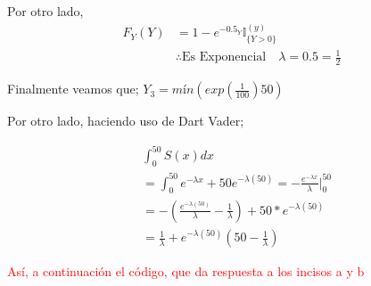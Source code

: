 \documentclass[
]{article}
\begin{document}
Por otro lado, \begin{align*}
F_{Y}(Y) &= 1 - e^{-0.5_{Y}} \mathbb{I}_{\{Y > 0\}}^{(y)}\\
&\therefore \text{Es Exponencial} \quad \lambda = 0.5 = \frac{1}{2}
\end{align*}

Finalmente veamos que; \(Y_{3} = mín(exp(\frac{1}{100})50)\)

Por otro lado, haciendo uso de Dart Vader;

\begin{align*}
& \int_{0}^{50} S(x)dx\\
&= \int_{0}^{50} e^{-\lambda x} + 50e^{-\lambda(50)} = -\frac{e^{-\lambda x}}{\lambda}|_{0}^{50}\\
&= - \left(\frac{e^{-\lambda(50)}}{\lambda} - \frac{1}{\lambda}\right) + 50 * e^{-\lambda(50)}\\
&= \frac{1}{\lambda} + e^{-\lambda(50)}(50 - \frac{1}{\lambda})
\end{align*}

\textcolor{red}{Así, a continuación el código, que da respuesta a los incisos a y b}
\end{document}
